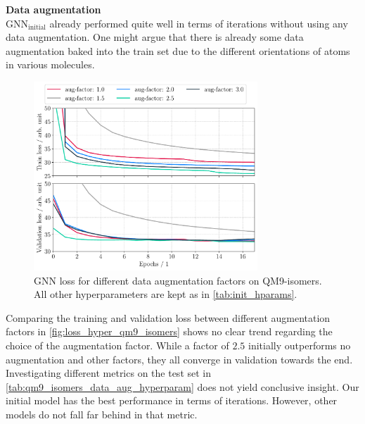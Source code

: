 \textbf{Data augmentation}\\
$\text{GNN}_\text{initial}$ already performed quite well in terms of iterations without using any data augmentation. One might argue that there is already some data augmentation baked into the train set due to the different orientations of atoms in various molecules. 
\begin{figure}[h]
    \centering
    \includegraphics[width=0.75\textwidth]{../fig/application/aug_train_val_loss.pdf}
    \caption[GNN loss different augmentation factors | QM9-isomers]{GNN loss for different data augmentation factors on QM9-isomers. All other hyperparameters are kept as in \autoref{tab:init_hparams}.}
    \label{fig:loss_hyper_qm9_isomers}
\end{figure}
Comparing the training and validation loss between different augmentation factors in \autoref{fig:loss_hyper_qm9_isomers} shows no clear trend regarding the choice of the augmentation factor. While a factor of $2.5$ initially outperforms no augmentation and other factors, they all converge in validation towards the end. 
Investigating different metrics on the test set in \autoref{tab:qm9_isomers_data_aug_hyperparam} does not yield conclusive insight. Our initial model has the best performance in terms of iterations. However, other models do not fall far behind in that metric.
